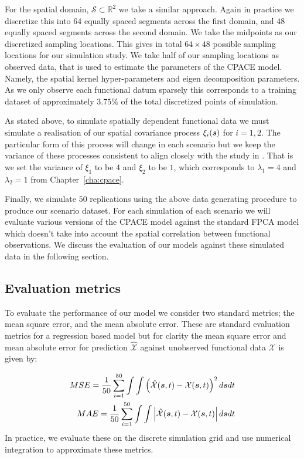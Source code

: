 For the spatial domain, $\mathcal{S} \subset \mathbb{R}^2$ we take a similar approach.
Again in practice we discretize this into $64$ equally spaced segments across the first domain, and $48$ equally spaced segments across the second domain.
We take the midpoints as our discretized sampling locations.
This gives in total $64 \times 48$ possible sampling locations for our simulation study.
We take half of our sampling locations as observed data, that is used to estimate the parameters of the CPACE model.
Namely, the spatial kernel hyper-parameters and eigen decomposition parameters.
As we only observe each functional datum sparsely this corresponds to a training dataset of approximately $3.75\%$ of the total discretized points of simulation.

As stated above, to simulate spatially dependent functional data we must simulate a realisation of our spatial covariance process $\xi_i(\bm{{s}})$ for $i=1,2$. 
The particular form of this process will change in each scenario but we keep the variance of these processes consistent to align closely with the study in \citep{yao_functional_2005}.
That is we set the variance of $\xi_1$ to be $4$ and $\xi_2$ to be $1$, which corresponds to $\lambda_1 = 4$ and $\lambda_2=1$ from Chapter~\ref{cha:cpace}.

Finally, we simulate $50$ replications using the above data generating procedure to produce our scenario dataset.
For each simulation of each scenario we will evaluate various versions of the CPACE model against the standard FPCA model which doesn't take into account the spatial correlation between functional observations.
We discuss the evaluation of our models against these simulated data in the following section. 

\subsection{Evaluation metrics \label{ssec:eval_metrics}}
To evaluate the performance of our model we consider two standard metrics; the mean square error, and the mean absolute error.
These are standard evaluation metrics for a regression based model but for clarity the mean square error and mean absolute error for prediction $\hat{\mathcal{X}}$ against unobserved functional data $\mathcal{X}$ is given by:

\begin{eqnarray}
	MSE = \frac{1}{50} \sum_{i=1}^{50} \int \int \left( \hat{\mathcal{X}}(\bm{{s}}, t) - \mathcal{X}(\bm{{s}}, t) \right)^2 d\bm{{s}} dt \nonumber \\
	MAE = \frac{1}{50} \sum_{i=1}^{50} \int \int \left| \hat{\mathcal{X}}(\bm{{s}}, t) - \mathcal{X}(\bm{{s}}, t) \right| d\bm{{s}} dt \nonumber
\end{eqnarray}
In practice, we evaluate these on the discrete simulation grid and use numerical integration to approximate these metrics.

